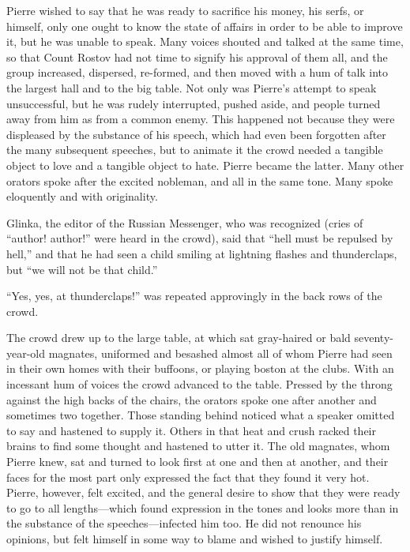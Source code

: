 Pierre wished to say that he was ready to sacrifice his money,
his serfs, or himself, only one ought to know the state of
affairs in order to be able to improve it, but he was unable to
speak. Many voices shouted and talked at the same time, so that
Count Rostov had not time to signify his approval of them all,
and the group increased, dispersed, re-formed, and then moved
with a hum of talk into the largest hall and to the big
table. Not only was Pierre's attempt to speak unsuccessful, but
he was rudely interrupted, pushed aside, and people turned away
from him as from a common enemy. This happened not because they
were displeased by the substance of his speech, which had even
been forgotten after the many subsequent speeches, but to animate
it the crowd needed a tangible object to love and a tangible
object to hate. Pierre became the latter. Many other orators
spoke after the excited nobleman, and all in the same tone. Many
spoke eloquently and with originality.

Glinka, the editor of the Russian Messenger, who was recognized
(cries of ``author! author!'' were heard in the crowd), said that
``hell must be repulsed by hell,'' and that he had seen a child
smiling at lightning flashes and thunderclaps, but ``we will not
be that child.''

``Yes, yes, at thunderclaps!'' was repeated approvingly in the
back rows of the crowd.

The crowd drew up to the large table, at which sat gray-haired or
bald seventy-year-old magnates, uniformed and besashed almost all
of whom Pierre had seen in their own homes with their buffoons,
or playing boston at the clubs. With an incessant hum of voices
the crowd advanced to the table. Pressed by the throng against
the high backs of the chairs, the orators spoke one after another
and sometimes two together.  Those standing behind noticed what a
speaker omitted to say and hastened to supply it. Others in that
heat and crush racked their brains to find some thought and
hastened to utter it. The old magnates, whom Pierre knew, sat and
turned to look first at one and then at another, and their faces
for the most part only expressed the fact that they found it very
hot. Pierre, however, felt excited, and the general desire to
show that they were ready to go to all lengths---which found
expression in the tones and looks more than in the substance of
the speeches---infected him too. He did not renounce his
opinions, but felt himself in some way to blame and wished to
justify himself.

